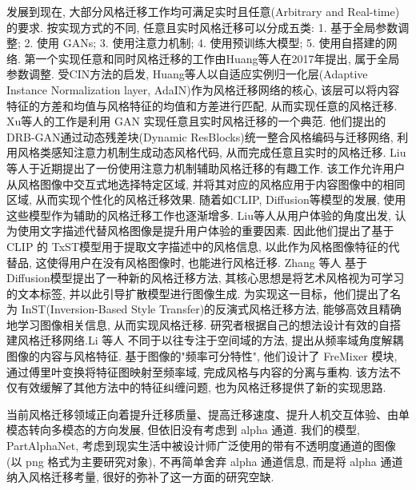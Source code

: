 发展到现在, 大部分风格迁移工作均可满足实时且任意(Arbitrary and Real-time)的要求. 按实现方式的不同, 任意且实时风格迁移可以分成五类: 1. 基于全局参数调整; 2. 使用 GANs; 3. 使用注意力机制; 4. 使用预训练大模型; 5. 使用自搭建的网络. 第一个实现任意和同时风格迁移的工作由Huang等人在2017年提出\cite{huang2017arbitrary}, 属于全局参数调整. 受CIN方法\cite{dumoulin2016learned}的启发, Huang等人以自适应实例归一化层(Adaptive Instance Normalization layer, AdaIN)作为风格迁移网络的核心, 该层可以将内容特征的方差和均值与风格特征的均值和方差进行匹配, 从而实现任意的风格迁移. 
Xu等人的工作\cite{xu2021drb}是利用 GAN 实现任意且实时风格迁移的一个典范. 他们提出的DRB-GAN通过动态残差块(Dynamic ResBlocks)统一整合风格编码与迁移网络, 利用风格类感知注意力机制生成动态风格代码, 从而完成任意且实时的风格迁移.
Liu等人于近期提出了一份使用注意力机制辅助风格迁移的有趣工作\cite{liu2304any}. 该工作允许用户从风格图像中交互式地选择特定区域, 并将其对应的风格应用于内容图像中的相同区域, 从而实现个性化的风格迁移效果.
随着如CLIP, Diffusion等模型的发展, 使用这些模型作为辅助的风格迁移工作也逐渐增多. Liu等人\cite{liu2023name}从用户体验的角度出发, 认为使用文字描述代替风格图像是提升用户体验的重要因素. 因此他们提出了基于 CLIP 的 TxST模型用于提取文字描述中的风格信息, 以此作为风格图像特征的代替品, 这使得用户在没有风格图像时, 也能进行风格迁移. Zhang 等人\cite{zhang2023inversion} 基于Diffusion模型提出了一种新的风格迁移方法, 其核心思想是将艺术风格视为可学习的文本标签, 并以此引导扩散模型进行图像生成. 为实现这一目标，他们提出了名为 InST(Inversion-Based Style Transfer)的反演式风格迁移方法, 能够高效且精确地学习图像相关信息, 从而实现风格迁移.
研究者根据自己的想法设计有效的自搭建风格迁移网络.Li 等人\cite{li2023frequency} 不同于以往专注于空间域的方法, 提出从频率域角度解耦图像的内容与风格特征. 基于图像的"频率可分特性", 他们设计了 FreMixer 模块, 通过傅里叶变换将特征图映射至频率域, 完成风格与内容的分离与重构. 该方法不仅有效缓解了其他方法中的特征纠缠问题, 也为风格迁移提供了新的实现思路.

当前风格迁移领域正向着提升迁移质量、提高迁移速度、提升人机交互体验、由单模态转向多模态的方向发展, 但依旧没有考虑到 alpha 通道. 我们的模型, PartAlphaNet, 考虑到现实生活中被设计师广泛使用的带有不透明度通道的图像(以 png 格式为主要研究对象), 不再简单舍弃 alpha 通道信息, 而是将 alpha 通道纳入风格迁移考量, 很好的弥补了这一方面的研究空缺.